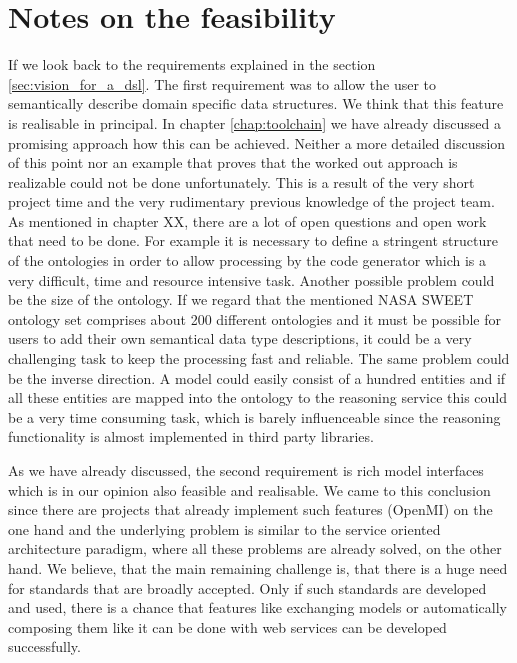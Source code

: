 \section{Notes on the feasibility}
\par
If we look back to the requirements explained in the section \ref{sec:vision_for_a_dsl}. The first requirement was to allow the user to semantically describe domain specific data structures. We think that this feature is realisable in principal. In chapter \ref{chap:toolchain} we have already discussed a promising approach how this can be achieved. Neither a more detailed discussion of this point nor an example that proves that the worked out approach is realizable could not be done unfortunately. This is a result of the very short project time and the very rudimentary previous knowledge of the project team.  As mentioned in chapter XX, there are a lot of open questions and open work that need to be done. For example it is necessary to define a stringent structure of the ontologies in order to allow processing by the code generator which is a very difficult, time and resource intensive task. Another possible problem could be the size of the ontology. If we regard that the mentioned NASA SWEET ontology set comprises about 200 different ontologies and it must be possible for users to add their own semantical data type descriptions, it could be a very challenging task to keep the processing fast and reliable. The same problem could be the inverse direction. A model could easily consist of a hundred entities and if all these entities are mapped into the ontology to the reasoning service this could be a very time consuming task, which is barely influenceable since the reasoning functionality is almost implemented in third party libraries.
\par
As we have already discussed, the second requirement is rich model interfaces which is in our opinion also feasible and realisable. We came to this conclusion since there are projects that already implement such features (OpenMI) on the one hand and the underlying problem is similar to the service oriented architecture paradigm, where all these problems are already solved, on the other hand. We believe, that the main remaining challenge is, that there is a huge need for standards that are broadly accepted. Only if such standards are developed and used, there is a chance that features like exchanging models or automatically composing them like it can be done with web services can be developed successfully.\\
